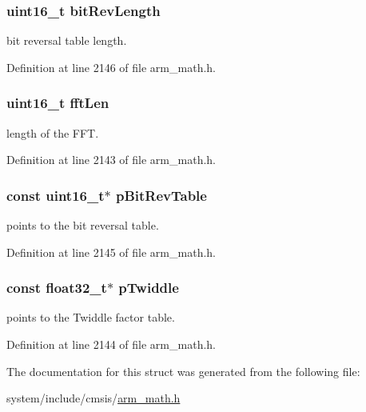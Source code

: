 \subsubsection[{\texorpdfstring{bit\+Rev\+Length}{bitRevLength}}]{\setlength{\rightskip}{0pt plus 5cm}uint16\+\_\+t bit\+Rev\+Length}\hypertarget{structarm__cfft__instance__f32_a65e1b3e327b8fab9404287ed8f347cc8}{}\label{structarm__cfft__instance__f32_a65e1b3e327b8fab9404287ed8f347cc8}
bit reversal table length. 

Definition at line 2146 of file arm\+\_\+math.\+h.

\subsubsection[{\texorpdfstring{fft\+Len}{fftLen}}]{\setlength{\rightskip}{0pt plus 5cm}uint16\+\_\+t fft\+Len}\hypertarget{structarm__cfft__instance__f32_ab8db3bbe7c61e6bb8ca2a55e3446e11a}{}\label{structarm__cfft__instance__f32_ab8db3bbe7c61e6bb8ca2a55e3446e11a}
length of the F\+FT. 

Definition at line 2143 of file arm\+\_\+math.\+h.

\subsubsection[{\texorpdfstring{p\+Bit\+Rev\+Table}{pBitRevTable}}]{\setlength{\rightskip}{0pt plus 5cm}const uint16\+\_\+t$\ast$ p\+Bit\+Rev\+Table}\hypertarget{structarm__cfft__instance__f32_a3b229432d381b0a511a9cdbe3aa74e78}{}\label{structarm__cfft__instance__f32_a3b229432d381b0a511a9cdbe3aa74e78}
points to the bit reversal table. 

Definition at line 2145 of file arm\+\_\+math.\+h.

\subsubsection[{\texorpdfstring{p\+Twiddle}{pTwiddle}}]{\setlength{\rightskip}{0pt plus 5cm}const {\bf float32\+\_\+t}$\ast$ p\+Twiddle}\hypertarget{structarm__cfft__instance__f32_a8292d9775f5c5472f59915649fe3b378}{}\label{structarm__cfft__instance__f32_a8292d9775f5c5472f59915649fe3b378}
points to the Twiddle factor table. 

Definition at line 2144 of file arm\+\_\+math.\+h.



The documentation for this struct was generated from the following file\+:\begin{DoxyCompactItemize}
\item 
system/include/cmsis/\hyperlink{arm__math_8h}{arm\+\_\+math.\+h}\end{DoxyCompactItemize}
